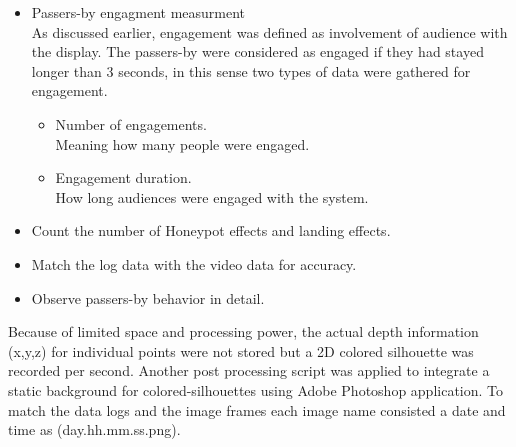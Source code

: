 \begin{enumerate}
\begin{itemize}

\item Passers-by engagment measurment \\
As discussed earlier, engagement was defined as involvement of audience with the display. The passers-by were considered as engaged if they had stayed longer than 3 seconds, in this sense two types of data were gathered for engagement.

        \begin{itemize}
        \item Number of engagements. \\
        Meaning how many people were engaged.

        \item Engagement duration. \\
        How long audiences were engaged with the system.

        \end{itemize}

\item Count the number of Honeypot effects and landing effects.
\item Match the log data with the video data for accuracy.
\item Observe passers-by behavior in detail.
\end{itemize}

Because of limited space and processing power, the actual depth information (x,y,z) for individual points were not stored but a 2D colored silhouette was recorded per second. Another post processing script was applied to integrate a static background for colored-silhouettes using Adobe Photoshop application. To match the data logs and the image frames each image name consisted a date and time as (day.hh.mm.ss.png).



\end{enumerate}
